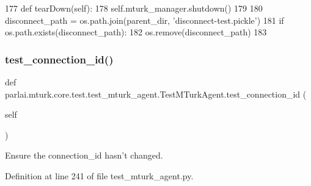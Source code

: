 \begin{DoxyCode}
177     \textcolor{keyword}{def }tearDown(self):
178         self.mturk\_manager.shutdown()
179 
180         disconnect\_path = os.path.join(parent\_dir, \textcolor{stringliteral}{'disconnect-test.pickle'})
181         \textcolor{keywordflow}{if} os.path.exists(disconnect\_path):
182             os.remove(disconnect\_path)
183 
\end{DoxyCode}
\mbox{\label{classparlai_1_1mturk_1_1core_1_1test_1_1test__mturk__agent_1_1TestMTurkAgent_add6279fa053fb76a2c8b6a1710635558}} 
\subsubsection{\texorpdfstring{test\+\_\+connection\+\_\+id()}{test\_connection\_id()}}
{\footnotesize\ttfamily def parlai.\+mturk.\+core.\+test.\+test\+\_\+mturk\+\_\+agent.\+Test\+M\+Turk\+Agent.\+test\+\_\+connection\+\_\+id (\begin{DoxyParamCaption}\item[{}]{self }\end{DoxyParamCaption})}

\begin{DoxyVerb}Ensure the connection_id hasn't changed.
\end{DoxyVerb}
 

Definition at line 241 of file test\+\_\+mturk\+\_\+agent.\+py.



